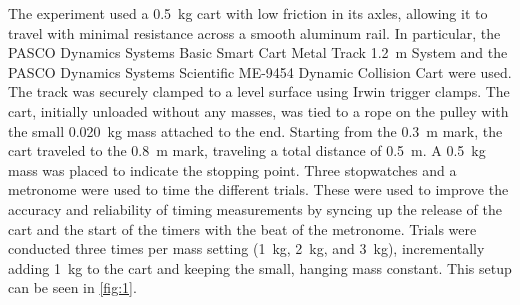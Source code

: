\documentclass[reprint,amsmath,amssymb,aps,twoside]{revtex4-2}
\begin{document}
The experiment used a \qty{0.5}{\kilo\gram} cart with low friction in its axles, allowing it to travel with minimal resistance across a smooth aluminum rail. In particular, the PASCO Dynamics Systems Basic Smart Cart Metal Track \qty{1.2}{\meter} System and the PASCO Dynamics Systems Scientific ME-9454 Dynamic Collision Cart were used. The track was securely clamped to a level surface using Irwin trigger clamps. The cart, initially unloaded without any masses, was tied to a rope on the pulley with the small \qty{0.020}{\kilo\gram} mass attached to the end. Starting from the \qty{0.3}{\meter} mark, the cart traveled to the \qty{0.8}{\meter} mark, traveling a total distance of \qty{0.5}{\meter}. A \qty{0.5}{\kilo\gram} mass was placed to indicate the stopping point. Three stopwatches and a metronome were used to time the different trials. These were used to improve the accuracy and reliability of timing measurements by syncing up the release of the cart and the start of the timers with the beat of the metronome. Trials were conducted three times per mass setting (\qty{1}{\kilo\gram}, \qty{2}{\kilo\gram}, and \qty{3}{\kilo\gram}), incrementally adding \qty{1}{\kilo\gram} to the cart and keeping the small, hanging mass constant. This setup can be seen in \cref{fig:1}.
\end{document}
